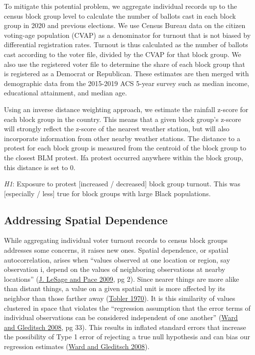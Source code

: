 \documentclass[
  12pt,
]{article}
\begin{document}
To mitigate this potential problem, we aggregate individual records up to the census block group level to calculate the number of ballots cast in each block group in 2020 and previous elections. We use Census Bureau data on the citizen voting-age population (CVAP) as a denominator for turnout that is not biased by differential registration rates. Turnout is thus calculated as the number of ballots cast according to the voter file, divided by the CVAP for that block group. We also use the registered voter file to determine the share of each block group that is registered as a Democrat or Republican. These estimates are then merged with demographic data from the 2015-2019 ACS 5-year survey such as median income, educational attainment, and median age.

Using an inverse distance weighting approach, we estimate the rainfall z-score for each block group in the country. This means that a given block group's z-score will strongly reflect the z-score of the nearest weather station, but will also incorporate information from other nearby weather stations. The distance to a protest for each block group is measured from the centroid of the block group to the closest BLM protest. Ifa protest occurred anywhere within the block group, this distance is set to 0.

\emph{H1}: Exposure to protest {[}increased / decreased{]} block group turnout. This was {[}especially / less{]} true for block groups with large Black populations.

\hypertarget{addressing-spatial-dependence}{%
\subsection*{Addressing Spatial Dependence}\label{addressing-spatial-dependence}}

While aggregating individual voter turnout records to census block groups addresses some concerns, it raises new ones. Spatial dependence, or spatial autocorrelation, arises when ``values observed at one location or region, say observation i, depend on the values of neighboring observations at nearby locations'' (\protect\hyperlink{ref-LeSage2009}{J. LeSage and Pace 2009}, pg 2). Since nearer things are more alike than distant things, a value on a given spatial unit is more affected by its neighbor than those farther away (\protect\hyperlink{ref-Tobler1970}{Tobler 1970}). It is this similarity of values clustered in space that violates the ``regression assumption that the error terms of individual observations can be considered independent of one another'' (\protect\hyperlink{ref-Ward2008}{Ward and Gleditsch 2008}, pg 33). This results in inflated standard errors that increase the possibility of Type 1 error of rejecting a true null hypothesis and can bias our regression estimates (\protect\hyperlink{ref-Ward2008}{Ward and Gleditsch 2008}).
\end{document}
